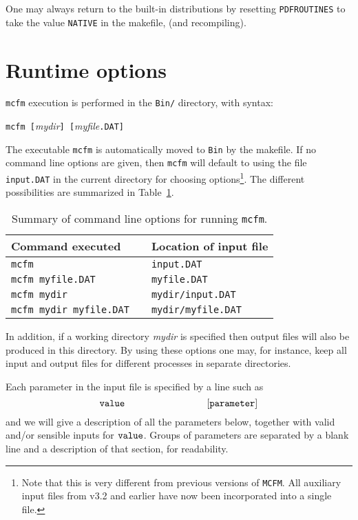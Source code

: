 \documentclass[12pt]{article}
\begin{document}
One may always return to the built-in distributions by resetting
{\tt PDFROUTINES} to take the value {\tt NATIVE}  in the makefile,
(and recompiling).
\clearpage
\section{Runtime options}

{\tt mcfm} execution is performed in the {\tt Bin/} directory,
with syntax:
\begin{center}
{\tt mcfm [}{\it mydir}{\tt ] [}{\it myfile}{\tt .DAT]}
\end{center}
The executable {\tt mcfm} is automatically moved to {\tt Bin} by the makefile.
If no command line options are given, then {\tt mcfm} will default
to using the file {\tt input.DAT} in the current directory for
choosing options\footnote{Note that this is very different from
previous versions of {\tt MCFM}. All auxiliary input files from v3.2 and
earlier have now been incorporated into a single file.}.
The different possibilities are summarized in Table~\ref{clopts}.
\begin{table}
\begin{center}
\begin{tabular}{l|cl}
Command executed && Location of input file \\
\hline
{\tt mcfm}                      && {\tt input.DAT} \\
{\tt mcfm myfile.DAT}           && {\tt myfile.DAT} \\
{\tt mcfm mydir}                && {\tt mydir/input.DAT} \\
{\tt mcfm mydir myfile.DAT}     && {\tt mydir/myfile.DAT} \\
\end{tabular}
\end{center}
\caption{Summary of command line options for running {\tt mcfm}.}
\label{clopts}
\end{table}
In addition, if a working directory {\it mydir} is specified then
output files will also be produced in this directory. By using these
options one may, for instance, keep all input and output files for
different processes in separate directories.

Each parameter in the input file is specified by a line such as
\begin{displaymath}
{\tt value} \hspace{3cm} {\tt [parameter]}
\end{displaymath}
and we will give a description of all the parameters below, together with
valid and/or sensible inputs for ${\tt value}$. Groups of parameters
are separated by a blank line and a description of that section, for
readability.
\end{document}
